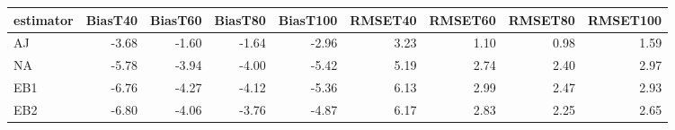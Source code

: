 \begin{table}[ht]
\centering
\begin{tabular}{lrrrrrrrr}
  \toprule
estimator & BiasT40 & BiasT60 & BiasT80 & BiasT100 & RMSET40 & RMSET60 & RMSET80 & RMSET100 \\ 
  \midrule
AJ & -3.68 & -1.60 & -1.64 & -2.96 & 3.23 & 1.10 & 0.98 & 1.59 \\ 
  NA & -5.78 & -3.94 & -4.00 & -5.42 & 5.19 & 2.74 & 2.40 & 2.97 \\ 
  EB1 & -6.76 & -4.27 & -4.12 & -5.36 & 6.13 & 2.99 & 2.47 & 2.93 \\ 
  EB2 & -6.80 & -4.06 & -3.76 & -4.87 & 6.17 & 2.83 & 2.25 & 2.65 \\ 
   \bottomrule
\end{tabular}
\end{table}
